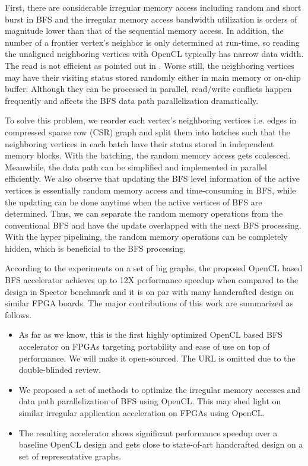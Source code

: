 First, there are considerable irregular memory access including 
random and short burst in BFS and the irregular memory access 
bandwidth utilization is orders of magnitude lower than that of the sequential 
memory access. In addition, the number of a 
frontier vertex's neighbor is only determined at run-time, so reading the unaligned 
neighboring vertices with OpenCL typically has narrow data width. The read is not efficient 
as pointed out in \cite{wang2017multikernel}. Worse still, the neighboring vertices 
may have their visiting status stored randomly either in main memory or on-chip buffer.
Although they can be processed in parallel, read/write conflicts happen frequently 
and affects the BFS data path parallelization dramatically. 

To solve this problem, we reorder each vertex's neighboring vertices i.e. 
edges in compressed sparse row (CSR) graph and split them into 
batches such that the neighboring vertices 
in each batch have their status stored in independent memory blocks. 
With the batching, the random memory access gets coalesced. Meanwhile, 
the data path can be simplified and implemented in parallel efficiently. 
We also observe that updating the BFS level information of the 
active vertices is essentially random memory access and time-consuming 
in BFS, while the updating can be done anytime when the active vertices of BFS 
are determined. Thus, we can separate the random memory operations from
the conventional BFS and have the update overlapped with the next BFS processing. 
With the hyper pipelining, the random memory operations can be completely 
hidden, which is beneficial to the BFS processing.

According to the experiments on a set of big graphs, the proposed OpenCL based BFS 
accelerator achieves up to 12X performance speedup when compared to the design 
in Spector benchmark and it is on par with many handcrafted design on similar FPGA boards. 
The major contributions of this work are summarized as follows.
\begin{itemize}
    \item As far as we know, this is the first highly optimized  
		OpenCL based BFS accelerator on FPGAs targeting portability and ease of 
		use on top of performance. We will make it open-sourced. The URL is 
		omitted due to the double-blinded review. 
    \item We proposed a set of methods to optimize the irregular
		memory accesses and data path parallelization of BFS using OpenCL. 
		This may shed light on similar irregular application acceleration on 
		FPGAs using OpenCL.
    \item The resulting accelerator shows significant performance speedup 
        over a baseline OpenCL design and gets close to state-of-art handcrafted 
		design on a set of representative graphs.
\end{itemize}

